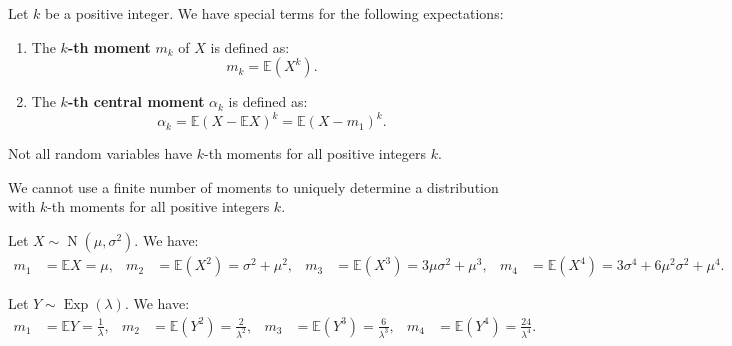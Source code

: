 \documentclass{huhtakm-template-book-v2}
\newcommand{\expect}{\mathbb{E}}
\DeclareMathOperator{\Exp}{Exp}
\DeclareMathOperator{\N}{N}
\begin{document}
    \begin{defn}
        Let $k$ be a positive integer. We have special terms for the following expectations:
        \begin{enumerate}
            \item The \textbf{$k$-th moment} $m_{k}$ of $X$ is defined as:
            \begin{equation*}
                m_{k} = \expect(X^{k}).
            \end{equation*}
            \item The \textbf{$k$-th central moment} $\alpha_{k}$ is defined as:
            \begin{equation*}
                \alpha_{k} = \expect(X-\expect{X})^{k} = \expect(X-m_{1})^{k}.
            \end{equation*}
        \end{enumerate}
    \end{defn}
    \begin{rem}
        Not all random variables have $k$-th moments for all positive integers $k$.
    \end{rem}
    \begin{rem}
        We cannot use a finite number of moments to uniquely determine a distribution with $k$-th moments for all positive integers $k$.
    \end{rem}
    \begin{eg}
        Let $X \sim \N(\mu,\sigma^{2})$. We have:
        \begin{align*}
            m_{1} &= \expect{X} = \mu, & m_{2} &= \expect(X^{2}) = \sigma^{2}+\mu^{2}, & m_{3} &= \expect(X^{3}) = 3\mu\sigma^{2}+\mu^{3}, & m_{4} &= \expect(X^{4}) = 3\sigma^{4}+6\mu^{2}\sigma^{2}+\mu^{4}.
        \end{align*}
    \end{eg}
    \begin{eg}
        Let $Y \sim \Exp(\lambda)$. We have:
        \begin{align*}
            m_{1} &= \expect{Y} = \frac{1}{\lambda}, & m_{2} &= \expect(Y^{2}) = \frac{2}{\lambda^{2}}, & m_{3} &= \expect(Y^{3}) = \frac{6}{\lambda^{3}}, & m_{4} &= \expect(Y^{4}) = \frac{24}{\lambda^{4}}.
        \end{align*}
    \end{eg}
    \newpage
\end{document}

